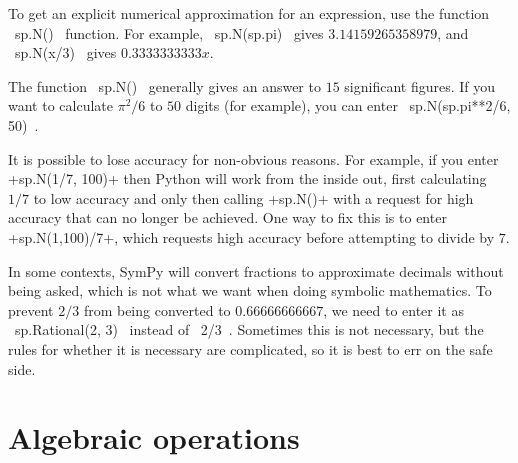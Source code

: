 \documentclass[a4paper,10pt]{amsbook}
\begin{document}
\begin{secenum}
 \item\label{float} To get an explicit numerical approximation for an
  expression, use the function \pcode~sp.N()~ function.  For example,
  \pcode~sp.N(sp.pi)~ gives $3.14159265358979$, and
  \pcode~sp.N(x/3)~ gives $0.3333333333 x$. 
%
 \item\label{floatdigits} The function \pcode~sp.N()~ generally gives an
  answer to $15$ significant figures.  If you want to
  calculate $\pi^2/6$ to $50$ digits (for example), you can
  enter \pcode~sp.N(sp.pi**2/6, 50)~.
%
 \item\label{digitslost} It is possible to lose accuracy for non-obvious
 reasons.  For example, if you enter \pcode+sp.N(1/7, 100)+ then
 Python will work from the inside out, first calculating $1/7$ to low
 accuracy and only then calling \pcode+sp.N()+ with a request for high
 accuracy that can no longer be achieved.  One way to fix this is to
 enter \pcode+sp.N(1,100)/7+, which requests high accuracy before
 attempting to divide by $7$.
\item\label{exactrational} In some contexts, SymPy will convert
 fractions to approximate decimals without being asked, which is not
 what we want when doing symbolic mathematics.  To prevent $2/3$ from
 being converted to $0.66666666667$, we need to enter it as
 \pcode~sp.Rational(2, 3)~ instead of \pcode~2/3~.  Sometimes this is not
 necessary, but the rules for whether it is necessary are complicated,
 so it is best to err on the safe side.
\end{secenum}


\section{Algebraic operations}
\end{document}
